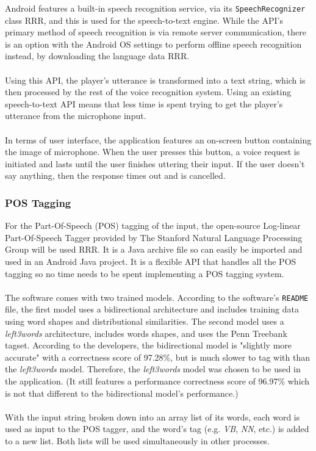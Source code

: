 \documentclass[11pt]{article}
\begin{document}
Android features a built-in speech recognition service, via its \texttt{SpeechRecognizer} class RRR, and this is used for the speech-to-text engine. While the API's primary method of speech recognition is via remote server communication, there is an option with the Android OS settings to perform offline speech recognition instead, by downloading the language data RRR.
\\
\\
Using this API, the player's utterance is transformed into a text string, which is then processed by the rest of the voice recognition system. Using an existing speech-to-text API means that less time is spent trying to get the player's utterance from the microphone input.
\\
\\
In terms of user interface, the application features an on-screen button containing the image of microphone. When the user presses this button, a voice request is initiated and lasts until the user finishes uttering their input. If the user doesn't say anything, then the response times out and is cancelled.

\subsubsection{POS Tagging}

For the Part-Of-Speech (POS) tagging of the input, the open-source Log-linear Part-Of-Speech Tagger provided by The Stanford Natural Language Processing Group will be used RRR. It is a Java archive file so can easily be imported and used in an Android Java project. It is a flexible API that handles all the POS tagging so no time needs to be spent implementing a POS tagging system. 
\\
\\
The software comes with two trained models. According to the software's \texttt{README} file, the first model uses a bidirectional architecture and includes training data using word shapes and distributional similarities. The second model uses a \textit{left3words} architecture, includes words shapes, and uses the Penn Treebank tagset. According to the developers, the bidirectional model is "slightly more accurate" with a correctness score of 97.28\%, but is much slower to tag with than the \textit{left3words} model. Therefore, the \textit{left3words} model was chosen to be used in the application. (It still features a performance correctness score of 96.97\% which is not that different to the bidirectional model's performance.)
\\
\\
With the input string broken down into an array list of its words, each word is used as input to the POS tagger, and the word's tag (e.g. \textit{VB}, \textit{NN}, etc.) is added to a new list. Both lists will be used simultaneously in other processes.
\end{document}
